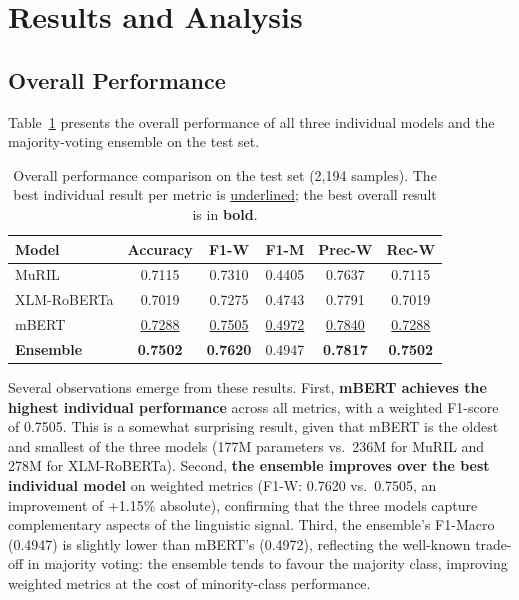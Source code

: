 \documentclass[12pt, a4paper]{article}
\begin{document}
\FloatBarrier

\section{Results and Analysis}
\label{sec:results}

\subsection{Overall Performance}

Table~\ref{tab:overall_results} presents the overall performance of all three individual models and the majority-voting ensemble on the test set.

\begin{table}[!htbp]
\centering
\caption{Overall performance comparison on the test set (2,194 samples). The best individual result per metric is \underline{underlined}; the best overall result is in \textbf{bold}.}
\label{tab:overall_results}
\begin{tabular}{l c c c c c}
\toprule
\textbf{Model} & \textbf{Accuracy} & \textbf{F1-W} & \textbf{F1-M} & \textbf{Prec-W} & \textbf{Rec-W} \\
\midrule
MuRIL          & 0.7115 & 0.7310 & 0.4405 & 0.7637 & 0.7115 \\
XLM-RoBERTa    & 0.7019 & 0.7275 & 0.4743 & 0.7791 & 0.7019 \\
mBERT          & \underline{0.7288} & \underline{0.7505} & \underline{0.4972} & \underline{0.7840} & \underline{0.7288} \\
\midrule
\textbf{Ensemble} & \textbf{0.7502} & \textbf{0.7620} & 0.4947 & \textbf{0.7817} & \textbf{0.7502} \\
\bottomrule
\end{tabular}
\end{table}

\vspace{1em}

Several observations emerge from these results. First, \textbf{mBERT achieves the highest individual performance} across all metrics, with a weighted F1-score of 0.7505. This is a somewhat surprising result, given that mBERT is the oldest and smallest of the three models (177M parameters vs.\ 236M for MuRIL and 278M for XLM-RoBERTa). Second, \textbf{the ensemble improves over the best individual model} on weighted metrics (F1-W: 0.7620 vs.\ 0.7505, an improvement of +1.15\% absolute), confirming that the three models capture complementary aspects of the linguistic signal. Third, the ensemble's F1-Macro (0.4947) is slightly lower than mBERT's (0.4972), reflecting the well-known trade-off in majority voting: the ensemble tends to favour the majority class, improving weighted metrics at the cost of minority-class performance.
\end{document}
